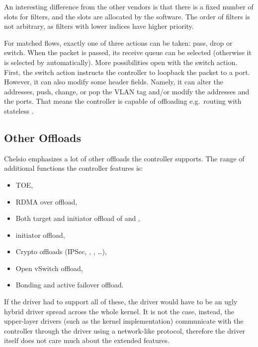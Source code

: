 An interesting difference from the other vendors is that there is a fixed number of
slots for filters, and the slots are allocated by the software. The order of
filters is not arbitrary, as filters with lower indices have higher priority.

For matched flows, exactly one of three actions can be taken: pass, drop or
switch. When the packet is passed, its receive queue can be selected (otherwise
it is selected by  automatically). More possibilities open with the switch
action.  First, the switch action instructs the controller to loopback
the packet to a port. However, it can also modify some header fields. Namely,
it can alter the  addresses, push, change, or pop the VLAN tag and/or modify the 
addresses and the  ports. That means the controller is capable of offloading
e.g.\ routing with stateless .

\subsection{Other Offloads}

Chelsio emphasizes a lot of other offloads the controller supports. The range
of additional functions the controller features is:

\begin{itemize}
\item {}\acrfull{TOE}, %
\item \acrfull{RDMA} over  offload,
\item Both target and initiator offload of  and ,
\item {} initiator offload,
\item Crypto offloads (IPSec, , , \dots),
\item Open vSwitch offload,
\item Bonding and active failover offload.
\end{itemize}

If the  driver had to support all of these, the driver would have to be
an ugly hybrid driver spread across the whole kernel. It is not the case,
instead, the upper-layer drivers (such as the  kernel implementation)
communicate with the controller through the  driver using a network-like
protocol, therefore the  driver itself does not care much about the
extended features.
